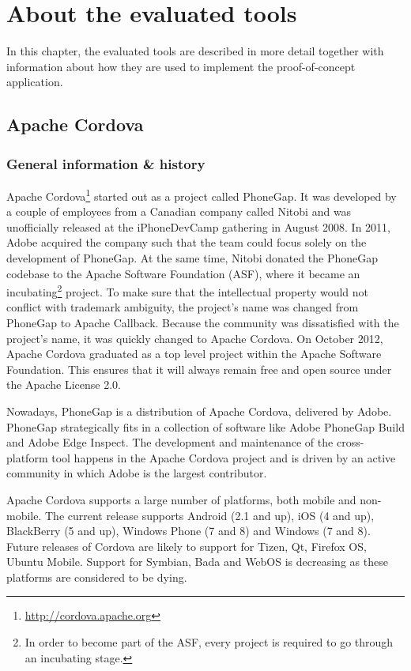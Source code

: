 \chapter{About the evaluated tools}
\label{chap:tools}

In this chapter, the evaluated tools are described in more detail together with information about how they are used to implement the proof-of-concept application.

\section{Apache Cordova}

\subsection{General information \& history}

Apache Cordova\footnote{\url{http://cordova.apache.org}} started out as a project called PhoneGap. It was developed by a couple of employees from a Canadian company called Nitobi and was unofficially released at the iPhoneDevCamp gathering in August 2008. In 2011, Adobe acquired the company such that the team could focus solely on the development of PhoneGap. At the same time, Nitobi donated the PhoneGap codebase to the Apache Software Foundation (ASF), where it became an incubating\footnote{In order to become part of the ASF, every project is required to go through an incubating stage.} project. To make sure that the intellectual property would not conflict with trademark ambiguity, the project's name was changed from PhoneGap to Apache Callback. Because the community was dissatisfied with the project's name, it was quickly changed to Apache Cordova. On October 2012, Apache Cordova graduated as a top level project within the Apache Software Foundation. This ensures that it will always remain free and open source under the Apache License 2.0.

Nowadays, PhoneGap is a distribution of Apache Cordova, delivered by Adobe. PhoneGap strategically fits in a collection of software like Adobe PhoneGap Build and Adobe Edge Inspect. The development and maintenance of the cross-platform tool happens in the Apache Cordova project and is driven by an active community in which Adobe is the largest contributor.

Apache Cordova supports a large number of platforms, both mobile and non-mobile. The current release supports Android (2.1 and up), iOS (4 and up), BlackBerry (5 and up), Windows Phone (7 and 8) and Windows (7 and 8). Future releases of Cordova are likely to support for Tizen, Qt, Firefox OS, Ubuntu Mobile. Support for Symbian, Bada and WebOS is decreasing as these platforms are considered to be dying. 


